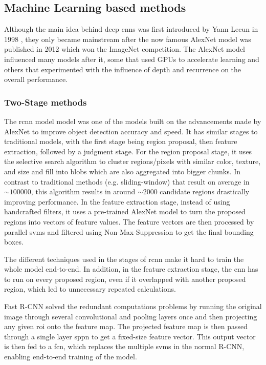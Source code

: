 \subsection{Machine Learning based methods}

 Although the main idea behind deep \gls{cnn}s was first introduced by Yann Lecun in 1998 \cite{lecun_gradient-based_1998}, they only became mainstream after the now famous AlexNet model was published in 2012 \cite{krizhevsky_imagenet_2012} which won the ImageNet competition. The AlexNet model influenced many models after it, some that used GPUs to accelerate learning and others that experimented with the influence of depth and recurrence on the overall performance.

 \subsubsection*{Two-Stage methods}

The \gls{rcnn} model \cite{girshick_rich_2014} model was one of the models built on the advancements made by AlexNet to improve object detection accuracy and speed. It has similar stages to traditional models, with the first stage being region proposal, then feature extraction, followed by a judgment stage. For the region proposal stage, it uses the selective search algorithm \cite{uijlings_selective_2013} to cluster regions/pixels with similar color, texture, and size and fill into blobs which are also aggregated into bigger chunks. In contrast to traditional methods (e.g. sliding-window) that result on average in $\sim100000$, this algorithm results in around $\sim2000$ candidate regions \cite{wang_object_2021} drastically improving performance. In the feature extraction stage, instead of using handcrafted filters, it uses a pre-trained AlexNet model to turn the proposed regions into vectors of feature values. The feature vectors are then processed by parallel \gls{svm}s and filtered using Non-Max-Suppression to get the final bounding boxes.

The different techniques used in the stages of \gls{rcnn} make it hard to train the whole model end-to-end. In addition, in the feature extraction stage, the \gls{cnn} has to run on every proposed region, even if it overlapped with another proposed region, which led to unnecessary repeated calculations.

Fast R-CNN \cite{girshick_fast_2015} solved the redundant computations problems by running the original image through several convolutional and pooling layers once and then projecting any given \gls{roi} onto the feature map. The projected feature map is then passed through a single layer \gls{sppn} to get a fixed-size feature vector. This output vector is then fed to a \gls{fcn}, which replaces the multiple \gls{svm}s in the normal R-CNN, enabling end-to-end training of the model.


